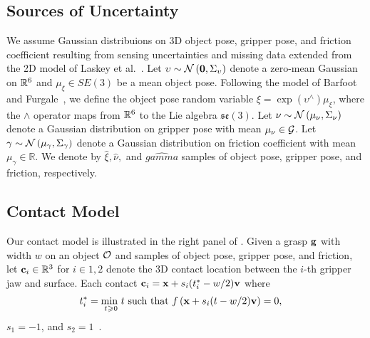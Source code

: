 \subsection{Sources of Uncertainty}
We assume Gaussian distribuions on 3D object pose, gripper pose, and friction coefficient resulting from sensing uncertainties and missing data extended from the 2D model of Laskey et al.~\cite{laskey2015bandits}.
Let $\upsilon \sim \mathcal{N}\left(\mathbf{0}, \Sigma_{\upsilon}\right)$ denote a zero-mean Gaussian on $\mathbb{R}^6$ and $\mu_{\xi} \in SE(3)$ be a mean object pose.
Following the model of Barfoot and Furgale~\cite{barfoot2014associating}, we define the object pose random variable $\xi = \exp\left( \upsilon^{\wedge} \right) \mu_{\xi}$, where the $\wedge$ operator maps from $\mathbb{R}^6$ to the Lie algebra $\mathfrak{se}(3)$.
Let $\nu \sim \mathcal{N}\left(\mu_{\nu}, \Sigma_{\nu}\right)$ denote a Gaussian distribution on gripper pose with mean $\mu_{\nu} \in \mathcal{G}$.
Let $\gamma \sim \mathcal{N}\left(\mu_{\gamma}, \Sigma_{\gamma} \right)$ denote a Gaussian distribution on friction coefficient with mean $\mu_{\gamma} \in \mathbb{R}$.
We denote by $\hat{\xi}, \hat{\nu},$ and $\hat{gamma}$ samples of object pose, gripper pose, and friction, respectively. 

\subsection{Contact Model}
Our contact model is illustrated in the right panel of .
Given a grasp $\mathbf{g}$ with width $w$ on an object $\mathcal{O}$ and samples of object pose, gripper pose, and friction, let $\mathbf{c}_i \in \mathbb{R}^3$ for $i \in {1, 2}$ denote the 3D contact location between the $i$-th gripper jaw and surface.
Each contact $\mathbf{c}_i = \mathbf{x} + s_i (t_i^* - w / 2) \mathbf{v}$ where
\begin{align*}
	t_i^* &= \underset{t \geqslant 0}{\text{min }} t \text{ such that } f\left(\mathbf{x} + s_i (t - w / 2) \mathbf{v}\right) = 0,
\end{align*}
\noindent$s_1 = -1$, and $s_2 = 1$~\cite{mahler2015gp}.

